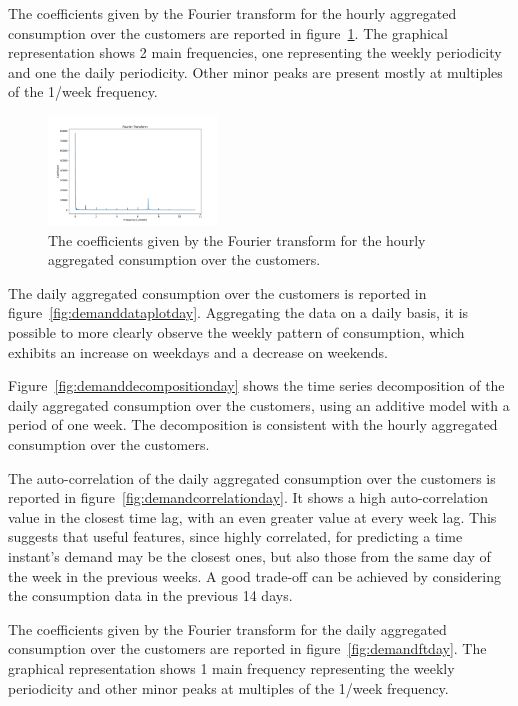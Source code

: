 The coefficients given by the Fourier transform for the hourly aggregated consumption over the customers are reported in figure~\ref{fig:demandft}.
The graphical representation shows 2 main frequencies, one representing the weekly periodicity and one the daily periodicity.
Other minor peaks are present mostly at multiples of the 1/week frequency.

\begin{figure}[H]
\centering
\includegraphics[width=0.4\textwidth]{images/demand/ft_hour_week}
\caption{The coefficients given by the Fourier transform for the hourly aggregated consumption over the customers.}
\label{fig:demandft}
\end{figure}

The daily aggregated consumption over the customers is reported in figure~\ref{fig:demanddataplotday}.
Aggregating the data on a daily basis, it is possible to more clearly observe the weekly pattern of consumption, which exhibits an increase on weekdays and a decrease on weekends.

Figure~\ref{fig:demanddecompositionday} shows the time series decomposition of the daily aggregated consumption over the customers, using an additive model with a period of one week.
The decomposition is consistent with the hourly aggregated consumption over the customers.

The auto-correlation of the daily aggregated consumption over the customers is reported in figure~\ref{fig:demandcorrelationday}.
It shows a high auto-correlation value in the closest time lag, with an even greater value at every week lag.
This suggests that useful features, since highly correlated, for predicting a time instant's demand may be the closest ones, but also those from the same day of the week in the previous weeks.
A good trade-off can be achieved by considering the consumption data in the previous 14 days.

The coefficients given by the Fourier transform for the daily aggregated consumption over the customers are reported in figure~\ref{fig:demandftday}.
The graphical representation shows 1 main frequency representing the weekly periodicity and other minor peaks at multiples of the 1/week frequency.

